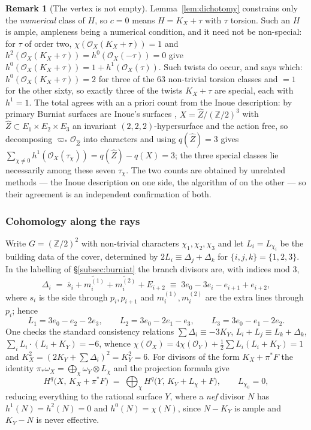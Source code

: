 \documentclass{amsart}
\theoremstyle{definition}
\newtheorem{remark}[theorem]{Remark}
\newcommand{\OO}{\mathcal{O}}
\newcommand{\ZZ}{\mathbb{Z}}
\begin{document}
\begin{remark}[The vertex is not empty]\label{rem:vertex}
Lemma~\ref{lem:dichotomy} constrains only the \emph{numerical} class of $H$, so $c=0$ means $H=K_X+\tau$ with $\tau$ torsion. Such an $H$ is ample, ampleness being a numerical condition, and it need not be non-special: for $\tau$ of order two, $\chi(\OO_X(K_X+\tau))=1$ and $h^2(\OO_X(K_X+\tau))=h^0(\OO_X(-\tau))=0$ give $h^0(\OO_X(K_X+\tau))=1+h^1(\OO_X(\tau))$. Such twists do occur, and \cite[Prop.~4.7]{Cho26} says which: $h^0(\OO_X(K_X+\tau))=2$ for three of the $63$ non-trivial torsion classes and $=1$ for the other sixty, so exactly three of the twists $K_X+\tau$ are special, each with $h^1=1$. The total agrees with an a priori count from the Inoue description: by \cite{BC11} primary Burniat surfaces are Inoue's surfaces \cite{Ino94}, $X=\widehat Z/(\ZZ/2)^3$ with $\widehat Z\subset E_1\times E_2\times E_3$ an invariant $(2,2,2)$-hypersurface and the action free, so decomposing $\varpi_*\OO_{\widehat Z}$ into characters and using $q(\widehat Z)=3$ gives $\sum_{\chi\neq0}h^1(\OO_X(\tau_\chi))=q(\widehat Z)-q(X)=3$; the three special classes lie necessarily among these seven $\tau_\chi$. The two counts are obtained by unrelated methods --- the Inoue description on one side, the algorithm of \cite{Cho26} on the other --- so their agreement is an independent confirmation of both.
\end{remark}

\subsubsection{Cohomology along the rays}
Write $G=(\ZZ/2)^2$ with non-trivial characters $\chi_1,\chi_2,\chi_3$ and let $L_i=L_{\chi_i}$ be the building data of the cover, determined by $2L_i\equiv\Delta_j+\Delta_k$ for $\{i,j,k\}=\{1,2,3\}$. In the labelling of \S\ref{subsec:burniat} the branch divisors are, with indices mod $3$,
\[
\Delta_i\;=\;\widetilde{s_i}+\widetilde{m_i^{(1)}}+\widetilde{m_i^{(2)}}+E_{i+2}
\;\equiv\;3e_0-3e_i-e_{i+1}+e_{i+2},
\]
where $s_i$ is the side through $p_i,p_{i+1}$ and $m_i^{(1)},m_i^{(2)}$ are the extra lines through $p_i$; hence
\[
L_1=3e_0-e_2-2e_3,\qquad L_2=3e_0-2e_1-e_3,\qquad L_3=3e_0-e_1-2e_2 .
\]
One checks the standard consistency relations $\sum\Delta_i\equiv-3K_Y$, $L_i+L_j\equiv L_k+\Delta_k$, $\sum_iL_i\cdot(L_i+K_Y)=-6$, whence $\chi(\OO_X)=4\chi(\OO_Y)+\tfrac12\sum L_i(L_i+K_Y)=1$ and $K_X^2=(2K_Y+\sum\Delta_i)^2=K_Y^2=6$. For divisors of the form $K_X+\pi^*F$ the identity $\pi_*\omega_X=\bigoplus_\chi\omega_Y\otimes L_\chi$ and the projection formula give
\begin{equation}\label{eq:eigen}
H^q\bigl(X,\,K_X+\pi^*F\bigr)\;=\;\bigoplus_{\chi}H^q\bigl(Y,\,K_Y+L_\chi+F\bigr),
\qquad L_{\chi_0}=0 ,
\end{equation}
reducing everything to the rational surface $Y$, where a \emph{nef} divisor $N$ has $h^1(N)=h^2(N)=0$ and $h^0(N)=\chi(N)$, since $N-K_Y$ is ample and $K_Y-N$ is never effective.
\end{document}

